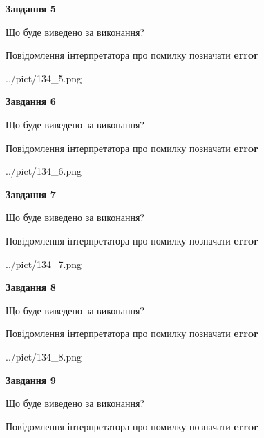 \documentclass[11pt, ukrainian]{article}
\begin{document}
{\begin {large}
{\begin {center}\textbf{Завдання 5}\end {center}}\par
Що буде виведено за виконання? \par
Повідомлення інтерпретатора про помилку позначати \textbf{error}

\begin{center}
	{../pict/134_5.png}
\end{center}
\newpage

{\begin {center}\textbf{Завдання 6}\end {center}}\par
Що буде виведено за виконання? \par
Повідомлення інтерпретатора про помилку позначати \textbf{error}

\begin{center}
	{../pict/134_6.png}
\end{center}
\newpage

{\begin {center}\textbf{Завдання 7}\end {center}}\par
Що буде виведено за виконання? \par
Повідомлення інтерпретатора про помилку позначати \textbf{error}

\begin{center}
	{../pict/134_7.png}
\end{center}
\newpage

{\begin {center}\textbf{Завдання 8}\end {center}}\par
Що буде виведено за виконання? \par
Повідомлення інтерпретатора про помилку позначати \textbf{error}

\begin{center}
	{../pict/134_8.png}
\end{center}
\newpage

{\begin {center}\textbf{Завдання 9}\end {center}}\par
Що буде виведено за виконання? \par
Повідомлення інтерпретатора про помилку позначати \textbf{error}


\end{large}}
\end{document}
